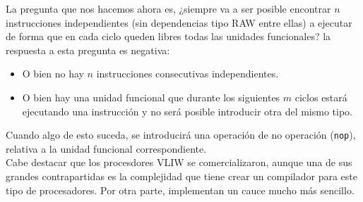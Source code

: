 La pregunta que nos hacemos ahora es, ¿siempre va a ser posible encontrar $n$ instrucciones independientes (sin dependencias tipo RAW entre ellas) a ejecutar de forma que en cada ciclo queden libres todas las unidades funcionales? la respuesta a esta pregunta es negativa:
\begin{itemize}
    \item O bien no hay $n$ instrucciones consecutivas independientes.
    \item O bien hay una unidad funcional que durante los siguientes $m$ ciclos estará ejecutando una instrucción y no será posible introducir otra del mismo tipo.
\end{itemize}
Cuando algo de esto suceda, se introducirá una operación de no operación (\verb|nop|), relativa a la unidad funcional correspondiente.\\

Cabe destacar que los procesdores VLIW se comercializaron, aunque una de sus grandes contrapartidas es la complejidad que tiene crear un compilador para este tipo de procesadores.
Por otra parte, implementan un cauce mucho más sencillo.
